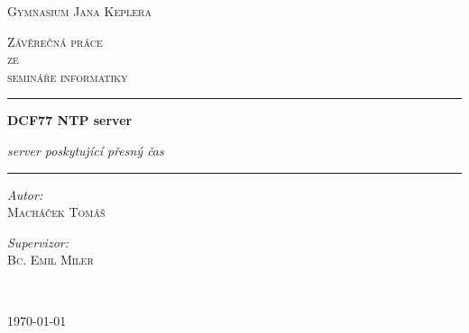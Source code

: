 \begin{titlepage}
    \begin{center}
        \vspace*{.06\textheight}

        \LARGE

        \textsc{Gymnasium Jana Keplera}

        \vspace{1.5cm}

        \Large

        \textsc{Závěrečná práce\\
        ze\\
        semináře informatiky}

        \vspace{1.5cm}

        \hrule

        \vspace{0.8cm}

        \LARGE
        \textbf{DCF77 NTP server}

        \vspace{0.2cm}
        \Large
        \emph{server poskytující přesný čas}

        \vspace{0.8cm}

        \hrule
        \vspace{2cm}

        \begin{minipage}[c]{0.4\textwidth}
            \begin{flushleft} \large
                \emph{Autor:}\\
                \textsc{Macháček Tomáš}
            \end{flushleft}
        \end{minipage}
        \begin{minipage}[c]{0.4\textwidth}
            \begin{flushright} \large
                \emph{Supervizor:} \\
                \textsc{Bc. Emil Miler}
            \end{flushright}
        \end{minipage}\\[3cm]

        \vspace{4cm}

        \today

        \vfill

    \end{center}
\end{titlepage}
